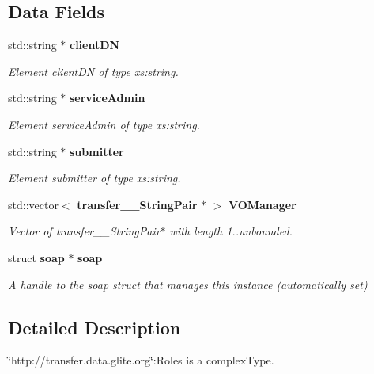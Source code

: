 \subsection*{Data Fields}
\begin{DoxyCompactItemize}
\item 
std::string $\ast$ {\bf clientDN}
\begin{DoxyCompactList}\small\item\em Element clientDN of type xs:string. \item\end{DoxyCompactList}\item 
std::string $\ast$ {\bf serviceAdmin}
\begin{DoxyCompactList}\small\item\em Element serviceAdmin of type xs:string. \item\end{DoxyCompactList}\item 
std::string $\ast$ {\bf submitter}
\begin{DoxyCompactList}\small\item\em Element submitter of type xs:string. \item\end{DoxyCompactList}\item 
std::vector$<$ {\bf transfer\_\-\_\-StringPair} $\ast$ $>$ {\bf VOManager}
\begin{DoxyCompactList}\small\item\em Vector of transfer\_\-\_\-StringPair$\ast$ with length 1..unbounded. \item\end{DoxyCompactList}\item 
struct {\bf soap} $\ast$ {\bf soap}\label{classtransfer____Roles_ac9a8fb773fc766a946850cf68711d025}

\begin{DoxyCompactList}\small\item\em A handle to the soap struct that manages this instance (automatically set) \item\end{DoxyCompactList}\end{DoxyCompactItemize}


\subsection{Detailed Description}
\char`\"{}http://transfer.data.glite.org\char`\"{}:Roles is a complexType. 

